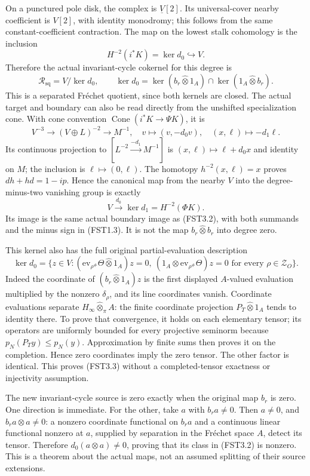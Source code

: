 On a punctured pole disk, the complex is \(\underline V[2]\). Its
universal-cover nearby coefficient is \(V[2]\), with identity monodromy;
this follows from the same constant-coefficient contraction. The map on
the lowest stalk cohomology is the inclusion \[
H^{-2}(i^*K)=\ker d_0\hookrightarrow V.
\tag{FST3.1}
\] Therefore the actual invariant-cycle cokernel for this degree is \[
\mathcal R_{\mathrm{sq}}=V/\ker d_0,
\qquad \ker d_0=\ker(b_r\widehat\otimes1_A)\cap\ker(1_A\widehat\otimes b_r).
\tag{FST3.2}
\] This is a separated Fréchet quotient, since both kernels are closed.
The actual target and boundary can also be read directly from the
unshifted specialization cone. With cone convention
\(\operatorname{Cone}(i^*K\to\Psi K)\), it is \[
V^{-3}\longrightarrow(V\oplus L)^{-2}\longrightarrow M^{-1},
\quad v\longmapsto(v,-d_0v),\quad(x,\ell)\longmapsto-d_1\ell.
\tag{FST3.4}
\] Its continuous projection to \([L^{-2}\xrightarrow{-d_1}M^{-1}]\) is
\((x,\ell)\mapsto\ell+d_0x\) and identity on \(M\); the inclusion is
\(\ell\mapsto(0,\ell)\). The homotopy \(h^{-2}(x,\ell)=x\) proves
\(dh+hd=1-ip\). Hence the canonical map from the nearby \(V\) into the
degree-minus-two vanishing group is exactly \[
V\xrightarrow{d_0}\ker d_1=H^{-2}(\Phi K).
\tag{FST3.5}
\] Its image is the same actual boundary image as (FST3.2), with both
summands and the minus sign in (FST1.3). It is not the map
\(b_r\widehat\otimes b_r\) into degree zero.

This kernel also has the full original partial-evaluation description \[
\ker d_0=\{z\in V:
(\mathrm{ev}_{\rho^\#}\Theta\widehat\otimes1_A)z=0,
\ (1_A\widehat\otimes\mathrm{ev}_{\rho^\#}\Theta)z=0
\text{ for every }\rho\in\mathscr Z_O\}.
\tag{FST3.3}
\] Indeed the coordinate of \((b_r\widehat\otimes1_A)z\) is the first
displayed \(A\)-valued evaluation multiplied by the nonzero
\(\delta_\rho\), and its line coordinates vanish. Coordinate evaluations
separate \(H_\infty\widehat\otimes_\pi A\): the finite coordinate
projection \(P_T\widehat\otimes1_A\) tends to identity there. To prove
that convergence, it holds on each elementary tensor; its operators are
uniformly bounded for every projective seminorm because
\(p_N(P_Ty)\le p_N(y)\). Approximation by finite sums then proves it on
the completion. Hence zero coordinates imply the zero tensor. The other
factor is identical. This proves (FST3.3) without a completed-tensor
exactness or injectivity assumption.

The new invariant-cycle source is zero exactly when the original map
\(b_r\) is zero. One direction is immediate. For the other, take \(a\)
with \(b_ra\ne0\). Then \(a\ne0\), and \(b_ra\otimes a\ne0\): a nonzero
coordinate functional on \(b_ra\) and a continuous linear functional
nonzero at \(a\), supplied by separation in the Fréchet space \(A\),
detect its tensor. Therefore \(d_0(a\otimes a)\ne0\), proving that its
class in (FST3.2) is nonzero. This is a theorem about the actual maps,
not an assumed splitting of their source extensions.

